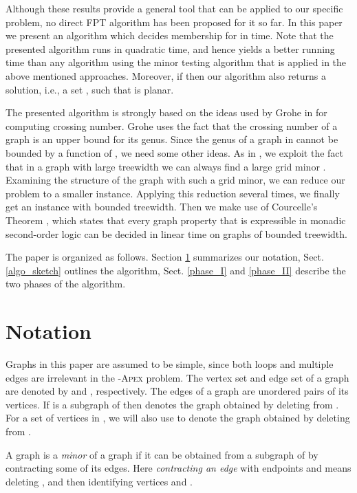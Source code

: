 \documentclass{llncs}
\begin{document}
Although these results provide a general tool that can be applied to our specific problem,
no direct FPT algorithm has been proposed for it so far.
In this paper we present an algorithm which decides membership for  in  time.
Note that the presented algorithm runs in quadratic time, and hence yields a better running time than
any algorithm using the minor testing algorithm that is applied in the above mentioned approaches.
Moreover, if  then our algorithm also returns a solution,
i.e., a set ,  such that  is planar.

The presented algorithm is strongly based on the ideas used by Grohe in \cite{gro04}
for computing crossing number.
Grohe uses the fact that the crossing number of a graph is an upper bound for its genus.
Since the genus of a graph in  cannot be bounded by a function of ,
we need some other ideas.
As in \cite{gro04}, we exploit the fact that in a graph with large treewidth
we can always find a large grid minor \cite{sey94}. Examining the structure of
the graph with such a grid minor, we can reduce our problem to a smaller instance.
Applying this reduction several times, we finally get an instance with
bounded treewidth. Then we make use of Courcelle's Theorem \cite{cou90}, which
states that every graph property that is expressible in monadic second-order logic
can be decided in linear time on graphs of bounded treewidth.

The paper is organized as follows.
Section \ref{notation} summarizes our notation,
Sect. \ref{algo_sketch} outlines the algorithm,
Sect. \ref{phase_I} and \ref{phase_II} describe the two phases of the algorithm.


\section{Notation}
\label{notation}

Graphs in this paper are assumed to be simple, since both loops and multiple edges are
irrelevant in the
-\textsc{Apex}
problem.
The vertex set and edge set of a graph 
are denoted by  and , respectively.
The edges of a graph are unordered pairs of its vertices.
If  is a subgraph of  then  denotes
the graph obtained by deleting  from . For a set of vertices  in ,
we will also use  to denote the graph obtained by deleting  from .

A graph  is a \emph{minor} of a graph  if it can be obtained from a subgraph of 
by contracting some of its edges. Here \emph{contracting an edge}  with endpoints  and  means
deleting , and then identifying vertices  and .
\end{document}

